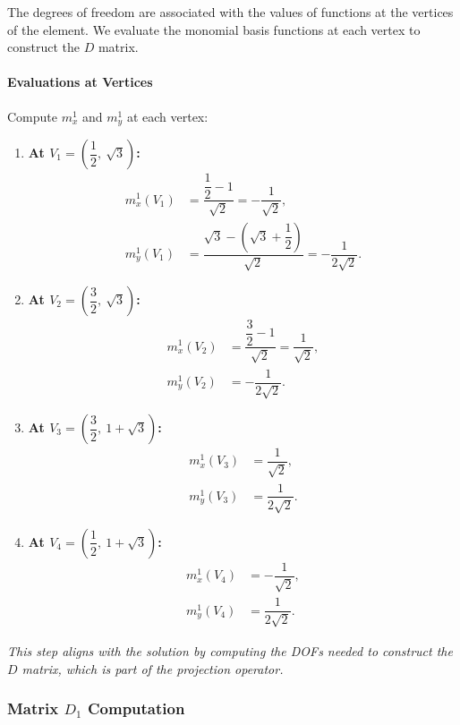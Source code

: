 \documentclass[class=article, crop=false]{standalone}
\begin{document}
The degrees of freedom are associated with the values of functions at the vertices of the element. We evaluate the monomial basis functions at each vertex to construct the $D$ matrix.

\paragraph{Evaluations at Vertices}

Compute $m_x^1$ and $m_y^1$ at each vertex:

\begin{enumerate}
    \item \textbf{At $V_1 = \left( \dfrac{1}{2},\ \sqrt{3} \right)$:}
    \[
    \begin{aligned}
    m_x^1(V_1) &= \dfrac{\dfrac{1}{2} - 1}{\sqrt{2}} = -\dfrac{1}{\sqrt{2}}, \\
    m_y^1(V_1) &= \dfrac{\sqrt{3} - \left( \sqrt{3} + \dfrac{1}{2} \right)}{\sqrt{2}} = -\dfrac{1}{2\sqrt{2}}.
    \end{aligned}
    \]
    \item \textbf{At $V_2 = \left( \dfrac{3}{2},\ \sqrt{3} \right)$:}
    \[
    \begin{aligned}
    m_x^1(V_2) &= \dfrac{\dfrac{3}{2} - 1}{\sqrt{2}} = \dfrac{1}{\sqrt{2}}, \\
    m_y^1(V_2) &= -\dfrac{1}{2\sqrt{2}}.
    \end{aligned}
    \]
    \item \textbf{At $V_3 = \left( \dfrac{3}{2},\ 1 + \sqrt{3} \right)$:}
    \[
    \begin{aligned}
    m_x^1(V_3) &= \dfrac{1}{\sqrt{2}}, \\
    m_y^1(V_3) &= \dfrac{1}{2\sqrt{2}}.
    \end{aligned}
    \]
    \item \textbf{At $V_4 = \left( \dfrac{1}{2},\ 1 + \sqrt{3} \right)$:}
    \[
    \begin{aligned}
    m_x^1(V_4) &= -\dfrac{1}{\sqrt{2}}, \\
    m_y^1(V_4) &= \dfrac{1}{2\sqrt{2}}.
    \end{aligned}
    \]
\end{enumerate}

\noindent
\textit{This step aligns with the solution by computing the DOFs needed to construct the $D$ matrix, which is part of the projection operator.}

\subsubsection{Matrix $D_1$ Computation}
\end{document}
